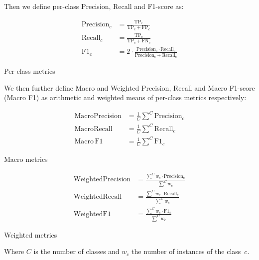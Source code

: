 \FloatBarrier

Then we define per-class Precision, Recall and F1-score as:

        {\setlength{\jot}{1em}
\begin{align}
    \mathrm{Precision}_c &= \frac{\mathrm{TP}_c}{\mathrm{TP}_c + \mathrm{FP}_c} \\
    \mathrm{Recall}_c &= \frac{\mathrm{TP}_c}{\mathrm{TP}_c + \mathrm{FN}_c} \\
    \mathrm{F1}_c &= 2 \cdot \frac{\mathrm{Precision}_c \cdot \mathrm{Recall}_c}{\mathrm{Precision}_c + \mathrm{Recall}_c}
\end{align}
}

\begin{center}
    \small Per-class metrics
\end{center}

\bigskip

\noindent We then further define Macro and Weighted Precision, Recall and Macro F1-score (Macro F1) as arithmetic and weighted means of per-class metrics respectively:

        {\setlength{\jot}{1em}
\begin{align}
    \mathrm{Macro Precision} &= \frac{1}{C} \sum^{C}{\mathrm{Precision}_c} \\
    \mathrm{Macro Recall} &= \frac{1}{C} \sum^{C}{\mathrm{Recall}_c} \\
    \mathrm{Macro \, F1} &=  \frac{1}{C} \sum^{C}{\mathrm{F1}_c}
\end{align}

\begin{center}
    \small Macro metrics
\end{center}

\begin{align}
    \mathrm{Weighted Precision} &=  \frac{\sum^{C}{w_c \cdot \mathrm{Precision}_c}}{\sum^{C}{w_c}} \\
    \mathrm{Weighted Recall} &=  \frac{\sum^{C}{w_c \cdot \mathrm{Recall}_c}}{\sum^{C}{w_c}} \\
    \mathrm{Weighted F1} &= \frac{\sum^{C}{w_c \cdot \mathrm{F1}_c}}{\sum^{C}{w_c}}
\end{align}
}

\begin{center}
    \small Weighted metrics
\end{center}

Where $C$ is the number of classes and $w_c$ the number of instances of the class~$c$.

